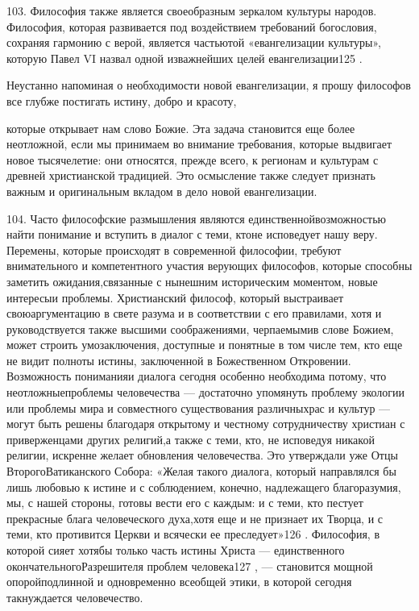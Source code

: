\documentclass[a5paper,10pt]{article}
\begin{document}
103. Философия также является своеобразным зеркалом культуры народов.
Философия, которая развивается под воздействием требований богословия, сохраняя
гармонию с верой, является частьютой «евангелизации культуры», которую Павел VI
назвал одной изважнейших целей евангелизации125 .

Неустанно напоминая о необходимости новой евангелизации, я прошу философов все
глубже постигать истину, добро и красоту,

которые открывает нам слово Божие. Эта задача становится еще более неотложной,
если мы принимаем во внимание требования, которые выдвигает новое тысячелетие:
они относятся, прежде всего, к регионам и культурам с древней христианской
традицией. Это осмысление также следует признать важным и оригинальным вкладом
в дело новой евангелизации.

104. Часто философские размышления являются единственнойвозможностью найти
понимание и вступить в диалог с теми, ктоне исповедует нашу веру. Перемены,
которые происходят в современной философии, требуют внимательного и
компетентного участия верующих философов, которые способны заметить
ожидания,связанные с нынешним историческим моментом, новые интересыи проблемы.
Христианский философ, который выстраивает своюаргументацию в свете разума и в
соответствии с его правилами, хотя и руководствуется также высшими
соображениями, черпаемымив слове Божием, может строить умозаключения, доступные
и понятные в том числе тем, кто еще не видит полноты истины, заключенной в
Божественном Откровении. Возможность пониманияи диалога сегодня особенно
необходима потому, что неотложныепроблемы человечества — достаточно упомянуть
проблему экологии или проблемы мира и совместного существования различныхрас и
культур — могут быть решены благодаря открытому и честному сотрудничеству
христиан с приверженцами других религий,а также с теми, кто, не исповедуя
никакой религии, искренне желает обновления человечества. Это утверждали уже
Отцы ВторогоВатиканского Собора: «Желая такого диалога, который направлялся бы
лишь любовью к истине и с соблюдением, конечно, надлежащего благоразумия, мы, с
нашей стороны, готовы вести его с каждым: и с теми, кто пестует прекрасные
блага человеческого духа,хотя еще и не признает их Творца, и с теми, кто
противится Церкви и всячески ее преследует»126 . Философия, в которой сияет
хотябы только часть истины Христа — единственного окончательногоРазрешителя
проблем человека127 , — становится мощной опоройподлинной и одновременно
всеобщей этики, в которой сегодня такнуждается человечество.
\end{document}
